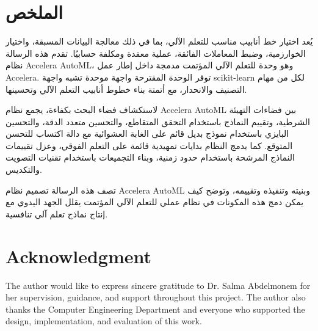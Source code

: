 \documentclass[12pt,a4paper,oneside]{report}
\begin{document}
\clearpage
\chapter*{\textarabic{الملخص}}

\begin{otherlanguage}{arabic}
يُعد اختيار خط أنابيب مناسب للتعلم الآلي، بما في ذلك معالجة البيانات
المسبقة، واختيار الخوارزمية، وضبط المعاملات الفائقة، عملية معقدة
ومكلفة حسابيًا. تقدم هذه الرسالة نظام \textenglish{Accelera AutoML}،
وهو وحدة للتعلم الآلي المؤتمت مدمجة داخل إطار عمل \textenglish{Accelera}.
توفر الوحدة المقترحة واجهة موحدة تشبه واجهة \textenglish{scikit-learn}
لكل من مهام التصنيف والانحدار، مع أتمتة بناء خطوط أنابيب التعلم الآلي
وتحسينها.

\medskip

لاستكشاف فضاء البحث بكفاءة، يجمع نظام \textenglish{Accelera AutoML}
بين فضاءات التهيئة الشرطية، وتقييم النماذج باستخدام التحقق المتقاطع،
والتحسين متعدد الدقة، والتحسين البايزي باستخدام نموذج بديل قائم على
الغابة العشوائية مع دالة اكتساب للتحسن المتوقع. كما يدمج النظام بدايات
تمهيدية قائمة على التعلم الفوقي، وعزل تقييمات النماذج المرشحة باستخدام
حدود زمنية، وبناء التجميعات باستخدام تقنيات التصويت والتكديس.

\medskip

تصف هذه الرسالة تصميم نظام \textenglish{Accelera AutoML} وبنيته وتنفيذه
وتقييمه، وتوضح كيف يمكن دمج هذه المكونات في نظام عملي للتعلم الآلي
المؤتمت يقلل الجهد اليدوي مع إنتاج نماذج تعلم آلي تنافسية.
\end{otherlanguage}

\chapter*{Acknowledgment}
The author would like to express sincere gratitude to Dr. Salma Abdelmonem for
her supervision, guidance, and support throughout this project. The author also
thanks the Computer Engineering Department and everyone who supported the
design, implementation, and evaluation of this work.

\clearpage
\tableofcontents
\clearpage
{}
{}
\listoffigures
\clearpage
{}
{}
\listoftables
\clearpage
\end{document}
